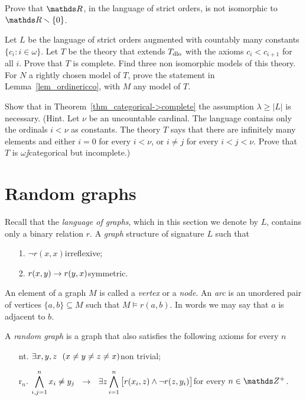 \documentclass[creche.tex]{subfiles}
\begin{document}
\begin{exercise}
Prove that $\RR$, in the language of strict orders, is not isomorphic to $\RR\sm\{0\}$.\QED
\end{exercise}

\begin{exercise}\label{VaughtEsempio3modelli}
Let $L$ be the language of strict orders augmented with countably many constants $\big\{c_i: i\in\omega\big\}$. Let $T$ be the theory that extends $T_{\rm dlo}$ with the axioms $c_i<c_{i+1}$ for all $i$. Prove that $T$ is complete. Find three non isomorphic models of this theory. For $N$ a rightly chosen model of $T$, prove the statement in Lemma~\ref{lem_ordinericco}, with $M$ any model of $T$.\QED
\end{exercise}


\begin{exercise}\label{categorica->completa}
Show that in Theorem~\ref{thm_categorical->complete} the assumption $\lambda\ge|L|$ is necessary. (Hint. Let $\nu$ be an uncountable cardinal. The language contains only the ordinals $i<\nu$ as constants. The theory $T$ says that there are infinitely many elements and either $i=0$ for every $i<\nu$, or $i\neq j$ for every $i<j<\nu$. Prove that $T$ is $\omega\jj$categorical but incomplete.)\QED
\end{exercise}


\section{Random graphs}
\label{randomgraph}

Recall that the \emph{language of graphs}, which in this section we denote by $L$, contains only a binary relation $r$. A \emph{graph\/} structure of signature $L$ such that

\begin{itemize}
\item[1.] $\neg r(x,x)$\hfill irreflexive;
\item[2.] $r(x,y)\rightarrow r(y,x)$\hfill symmetric.
\end{itemize}

An element of a graph $M$ is called a \emph{vertex\/} or a \emph{node}. An \emph{arc\/} is an unordered pair of vertices $\{a,b\}\subseteq M$ such that $M\models r(a,b)$. In words we may say that $a$ is adjacent to $b$.

A \emph{random graph\/} is a graph that also satisfies the following axioms for every $n$
\begin{itemize}
\item[nt.] $\exists x,y,z\ \ (x\neq y\neq z\neq x)$\hfill non trivial;
\item[r$_n$.] $\displaystyle\bigwedge^n_{i,j=1} x_i\neq y_j\ \ \imp\ \ \E z \bigwedge^n_{i=1} \big[r(x_i,z) \wedge \neg r(z,y_i)\big]$\hfill for every $n\in\ZZ^+$.
\end{itemize}
\end{document}
